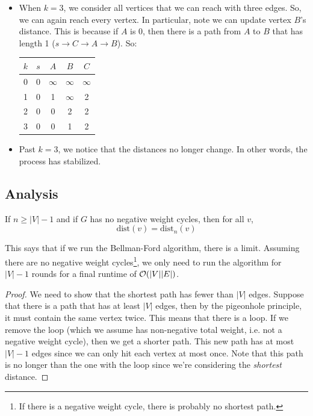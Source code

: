 \documentclass[letterpaper]{article}
\begin{document}
\begin{mdframed}[]
\begin{itemize}
        \item When $k = 3$, we consider all vertices that we can reach with three edges. So, we can again reach every vertex. In particular, note we can update vertex $B$'s distance. This is because if $A$ is 0, then there is a path from $A$ to $B$ that has length 1 ($s \to C \to A \to B$). So: 
        \begin{center}
            \begin{tabular}{c|c c c c}
                $k$ & $s$   & $A$       & $B$       & $C$ \\ 
                \hline 
                0   & 0     & $\infty$  & $\infty$  & $\infty$ \\ 
                1   & 0     & 1         & $\infty$  & 2 \\ 
                2   & 0     & 0         & 2         & 2 \\ 
                3   & 0     & 0         & 1         & 2
            \end{tabular}
        \end{center}

        \item Past $k = 3$, we notice that the distances no longer change. In other words, the process has stabilized. 
    \end{itemize}
\end{mdframed}

\subsection{Analysis}
\begin{proposition}
    If $n \geq |V| - 1$ and if $G$ has no negative weight cycles, then for all $v$,
    \[\text{dist}(v) = \text{dist}_{n}(v)\]
\end{proposition}
This says that if we run the Bellman-Ford algorithm, there is a limit. Assuming there are no negative weight cycles\footnote{If there is a negative weight cycle, there is probably no shortest path.}, we only need to run the algorithm for $|V| - 1$ rounds for a final runtime of $\mathcal{O}(|V||E|)$.

\begin{mdframed}[]
    \begin{proof}
        We need to show that the shortest path has fewer than $|V|$ edges. Suppose that there is a path that has at least $|V|$ edges, then by the pigeonhole principle, it must contain the same vertex twice. This means that there is a loop. If we remove the loop (which we assume has non-negative total weight, i.e. not a negative weight cycle), then we get a shorter path. This new path has at most $|V| - 1$ edges since we can only hit each vertex at most once. Note that this path is no longer than the one with the loop since we're considering the \emph{shortest} distance. 
    \end{proof}
\end{mdframed}
\end{document}
